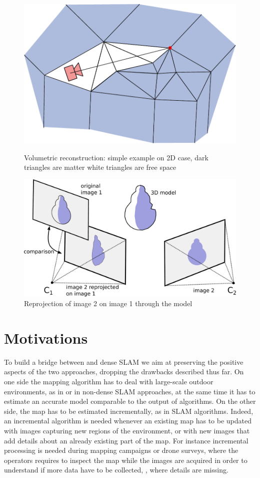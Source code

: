 \begin{figure}
\centering
\begin{minipage}{.5\textwidth}
  \centering
  \includegraphics[width=0.5\columnwidth]{./img/spacecarv}
 \caption{Volumetric reconstruction: simple example on 2D case, dark triangles are matter white triangles are free space}
 \label{fig:Volumetricc}
\end{minipage}%
\begin{minipage}{.5\textwidth}
  \centering
  \includegraphics[width=0.5\columnwidth]{./img/reprojOr}
 \caption{Reprojection of image 2 on  image 1 through the model}
 \label{fig:reproj}
\end{minipage}
\end{figure}
\section{Motivations}
To build a bridge between \mvs and dense SLAM we aim at preserving the positive aspects of the two approaches, dropping the drawbacks described thus far. 
On one side the mapping algorithm has to deal with large-scale outdoor environments, as in \mvs or in non-dense SLAM approaches, at the same time it has to estimate an accurate model comparable to the output of \mvs algorithms.
On the other  side, the map has to be estimated incrementally, as in SLAM algorithms.
Indeed, an incremental algorithm is needed whenever an existing map has to be updated with images capturing new regions of the environment, or with new images that add details about an already existing part of the map.
For instance incremental processing  is needed during mapping campaigns or drone surveys, where the operators requires to inspect the map while the images are  acquired in order to understand if more data have to be collected, \eg, where details are missing.


